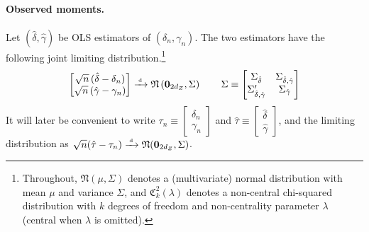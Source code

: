 \paragraph*{Observed moments.}
Let \((\hat \delta,\hat \gamma)\) be OLS estimators of \((\delta_n,\gamma_n)\). The two estimators have the following joint limiting distribution.\footnote{Throughout, \(\mathfrak{N}(\mu,\Sigma)\) denotes a (multivariate) normal distribution with mean \(\mu\) and variance \(\Sigma\), and \(\mathfrak{C}^2_k(\lambda)\) denotes a non-central chi-squared distribution with \(k\) degrees of freedom and non-centrality parameter \(\lambda\) (central when \(\lambda\) is omitted).}
\begin{align}
    \begin{bmatrix}
        \sqrt{n}\,(\hat \delta - \delta_n) \\
        \sqrt{n}\,(\hat \gamma - \gamma_n) \\
    \end{bmatrix}
    \xrightarrow{{\scriptscriptstyle \mathrm{\;d\;}}}
    \mathfrak{N}\left(\mathbf{0}_{2d_Z},\Sigma\right)
    \qquad 
    \Sigma   \equiv 
   \begin{bmatrix}
       \Sigma_{\hat \delta} & \Sigma_{\hat \delta,\hat \gamma} \\ 
       \Sigma_{\hat \delta,\hat \gamma}' & \Sigma_{\hat \gamma}
   \end{bmatrix}
\end{align}
It will later be convenient to write
\(\tau_n \equiv \left[\begin{smallmatrix}
    \delta_n \\ 
    \gamma_n
\end{smallmatrix}\right]\) and 
\(\hat \tau \equiv \left[\begin{smallmatrix}
    \hat \delta \\ 
    \hat \gamma
\end{smallmatrix}\right]\), and
the limiting distribution as \(\sqrt{n}(\hat\tau-\tau_n) \xrightarrow{{\scriptscriptstyle \mathrm{\;d\;}}} \mathfrak{N}(\mathbf{0}_{2d_Z},\Sigma)\). 

